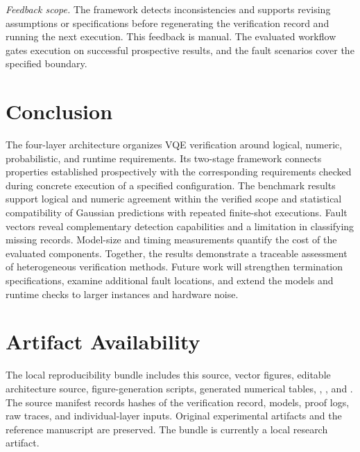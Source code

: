 \documentclass[conference]{IEEEtran}
\begin{document}
\emph{Feedback scope.} The framework detects inconsistencies and supports revising assumptions or specifications before regenerating the verification record and running the next execution. This feedback is manual. The evaluated workflow gates execution on successful prospective results, and the fault scenarios cover the specified boundary.

\section{Conclusion}
The four-layer architecture organizes VQE verification around logical, numeric, probabilistic, and runtime requirements. Its two-stage framework connects properties established prospectively with the corresponding requirements checked during concrete execution of a specified configuration. The benchmark results support logical and numeric agreement within the verified scope and statistical compatibility of Gaussian predictions with repeated finite-shot executions. Fault vectors reveal complementary detection capabilities and a limitation in classifying missing records. Model-size and timing measurements quantify the cost of the evaluated components. Together, the results demonstrate a traceable assessment of heterogeneous verification methods. Future work will strengthen termination specifications, examine additional fault locations, and extend the models and runtime checks to larger instances and hardware noise.

\section*{Artifact Availability}
The local reproducibility bundle includes this source, vector figures, editable architecture source, figure-generation scripts, generated numerical tables, , , and . The source manifest records hashes of the verification record, models, proof logs, raw traces, and individual-layer inputs. Original experimental artifacts and the reference manuscript are preserved. The bundle is currently a local research artifact.



\end{document}
